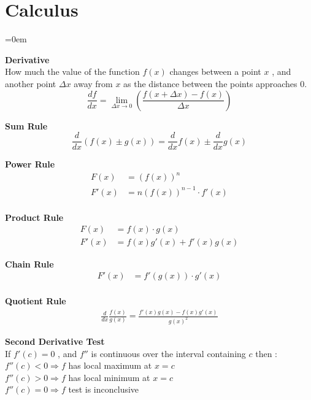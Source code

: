 

\section{Calculus}
\label{sec:calculus}
\parindent=0em



\textbf{Derivative} \\
How much the value of the function \( f(x) \) changes between a point \( x \) , and another point \( \Delta x \) away from \( x \) as the distance between the points approaches 0.
\[
	\frac{df}{dx} = \lim_{\Delta x \to 0} \left( \frac{f(x+\Delta x) - f(x)}{\Delta x} \right)
\]

\textbf{Sum Rule}
\[
	\frac{d}{dx} \left( f(x) \pm g(x) \right) = \frac{d}{dx}f(x) \pm \frac{d}{dx}g(x)
\]


\textbf{Power Rule}
\[
\begin{aligned}
	F(x)              & = (f(x))^{n} \\
	F'(x)             & = n(f(x))^{n-1} \cdot f'(x) \\
\end{aligned}
\]

\textbf{Product Rule}
\[
\begin{aligned}
	F(x)  & = f(x) \cdot g(x) \\
	F'(x) & = f(x)g'(x) + f'(x)g(x)
\end{aligned}
\]


\textbf{Chain Rule}
\[
\begin{aligned}
F'(x)           & = f'(g(x)) \cdot g'(x)                      \\
\end{aligned}
\]

\textbf{Quotient Rule}
\[
\begin{aligned}
	\frac{d}{dx} \frac{f(x)}{g(x)} = \frac{f'(x)g(x) - f(x)g'(x)}{g(x)^2}
\end{aligned}
\]

\textbf{Second Derivative Test}\\
If \( f'(c) = 0 \) , and \( f'' \) is continuous over the interval containing \( c \) then : \\
\( f''(c) < 0 \Rightarrow f \) has local maximum at \( x = c \)\\
\( f''(c) > 0 \Rightarrow f \) has local minimum at \( x = c \)\\
\( f''(c) = 0 \Rightarrow f \) test is inconclusive \\


